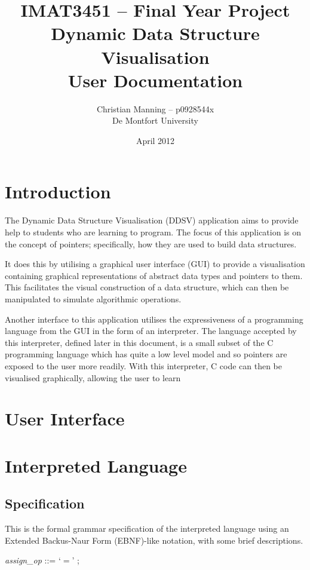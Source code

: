 \documentclass[a4paper,11pt]{article}
\author{Christian Manning -- p0928544x\\
De Montfort University}
\title{IMAT3451 -- Final Year Project\\
    Dynamic Data Structure Visualisation\\
    User Documentation
}
\date{April 2012}
\begin{document}
\maketitle

\tableofcontents

\pagebreak

\section{Introduction}

The Dynamic Data Structure Visualisation (DDSV) application aims to provide help to students who are learning to program.
The focus of this application is on the concept of pointers; specifically, how they are used to build data structures.

It does this by utilising a graphical user interface (GUI) to provide a visualisation containing graphical representations of abstract data types and pointers to them.
This facilitates the visual construction of a data structure, which can then be manipulated to simulate algorithmic operations.

Another interface to this application utilises the expressiveness of a programming language from the GUI in the form of an interpreter.
The language accepted by this interpreter, defined later in this document, is a small subset of the C programming language which has quite a low level model and so pointers are exposed to the user more readily.
With this interpreter, C code can then be visualised graphically, allowing the user to learn 

\section{User Interface}

\section{Interpreted Language}

\subsection{Specification}

This is the formal grammar specification of the interpreted language using an Extended Backus-Naur Form (EBNF)-like notation, with some brief descriptions.

\noindent\textit{assign\_op} ::=
    `$=$'
    ;
\end{document}
